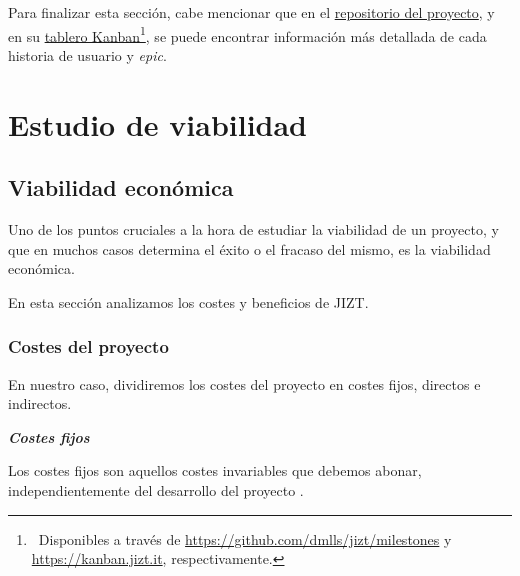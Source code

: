 Para finalizar esta sección, cabe mencionar que en el \href{https://github.com/dmlls/jizt/milestones}{repositorio del proyecto}, y en su \href{https://board.jizt.it/public/board/c08ea3322e2876652a0581e79d6430e2dc0c27720d8a06d7853e84c3cd2b}{tablero Kanban}\footnote{\, Disponibles a través de \href{https://github.com/dmlls/jizt/milestones}{https://github.com/dmlls/jizt/milestones} y \\ \href{https://kanban.jizt.it}{https://kanban.jizt.it}, respectivamente.}, se puede encontrar información más detallada de cada historia de usuario y \emph{epic}.

\vspace{2cm}

\section{Estudio de viabilidad}

\subsection{Viabilidad económica}

Uno de los puntos cruciales a la hora de estudiar la viabilidad de un proyecto, y que en muchos casos determina el éxito o el fracaso del mismo, es la viabilidad económica.

En esta sección analizamos los costes y beneficios de JIZT.


\subsubsection{Costes del proyecto}

En nuestro caso, dividiremos los costes del proyecto en costes fijos, directos e indirectos.

\vspace{0.4cm}
\noindent
\textbf{\emph{Costes fijos}}

Los costes fijos son aquellos costes invariables que debemos abonar, independientemente del desarrollo del proyecto \cite{perez18}.

